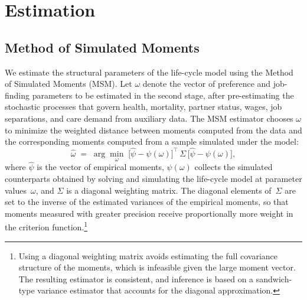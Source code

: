 

\section{Estimation}
\label{sec:estimation}

\subsection{Method of Simulated Moments}
\label{sec:msm}

We estimate the structural parameters of the life-cycle model using the Method
of Simulated Moments (MSM).  Let $\omega$ denote the vector of preference and
job-finding parameters to be estimated in the second stage, after
pre-estimating the stochastic processes that govern health, mortality, partner
status, wages, job separations, and care demand from auxiliary data.  The MSM
estimator chooses $\omega$ to minimize the weighted distance between moments
computed from the data and the corresponding moments computed from a sample
simulated under the model:
%
\begin{equation}
\label{eq:msm}
  \hat\omega
  \;=\;
  \arg\min_{\omega}\;
  \bigl[\hat\psi - \psi(\omega)\bigr]^{\!\top}
  \,\Sigma\,
  \bigl[\hat\psi - \psi(\omega)\bigr],
\end{equation}
%
where $\hat\psi$ is the vector of empirical moments, $\psi(\omega)$ collects
the simulated counterparts obtained by solving and simulating the life-cycle
model at parameter values~$\omega$, and $\Sigma$ is a diagonal weighting
matrix.  The diagonal elements of~$\Sigma$ are set to the inverse of the
estimated variances of the empirical moments, so that moments measured with
greater precision receive proportionally more weight in the criterion
function.\footnote{Using a diagonal weighting matrix avoids estimating the
full covariance structure of the moments, which is infeasible given the
large moment vector.  The resulting estimator is consistent, and inference
is based on a sandwich-type variance estimator that accounts for the
diagonal approximation.}

